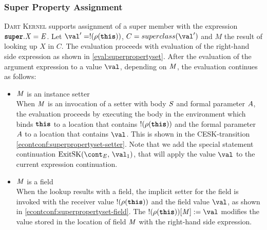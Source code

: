 \documentclass[a4paper,oneside,fleqn]{article}
\newcommand{\kernel}{\textsc{Dart Kernel}}
\newcommand{\synt}[1]{\ensuremath{\text{\textbf{\texttt{#1}}}}}
\newcommand{\this}{\synt{this}}
\newcommand{\idmeta}{\ensuremath{\mathit{X}}}
\begin{document}
\subsubsection{Super Property Assignment}
\label{subsubsec:super-property-assignemnt}

\kernel{} supports assignment of a super member with the expression $\SuperPropertySet{\idmeta}{\expressionmeta}$.
Let $\val' = \deref{(\env(\this))}$, $C = \superclass{\val'}$ and $M$ the result of looking up $\idmeta$ in $C$.
The evaluation proceeds with evaluation of the right-hand side expression as shown in \eqref{eval:superpropertyset}.
After the evaluation of the argument expression to a value $\val$, depending on $\mathit{M}$, the evaluation continues as follows:

\begin{itemize}
    \item $\mathit{M}$ is an instance setter\\
        When $\mathit{M}$ is an invocation of a setter with body $\mathit{S}$ and formal parameter $A$, the evaluation proceeds by executing the body in the environment which binds $\this$ to a location that contains $\deref{(\env(\this))}$ and the formal parameter $A$ to a location that contains $\val$.
        This is shown in the CESK-transition \eqref{econtconf:superpropertyset-setter}.
        Note that we add the special statement continuation $\ExitSK{\val_1}$, that will apply the value $\val$ to the current expression continuation.

    \item $\mathit{M}$ is a field\\
        When the lookup results with a field, the implicit setter for the field is invoked with the receiver value $\deref{(\env(\this))}$ and the field value $\val$, as shown in \eqref{econtconf:superpropertyset-field}.
        The $\update{\deref{(\env(\this))}[\membermeta]}{\val}$ modifies the value stored in the location of field $\mathit{M}$ with the right-hand side expression.

\end{itemize}
\end{document}
